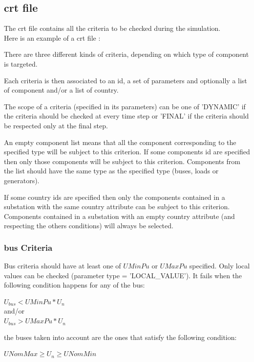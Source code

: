 \documentclass[a4paper, 12pt]{report}
\begin{document}
\subsection{crt file}

The crt file contains all the criteria to be checked during the
simulation.
\\

Here is an example of a crt file :


There are three different kinds of criteria, depending on which type of
component is targeted.

Each criteria is then associated to an id, a set of parameters and optionally a
list of component and/or a list of country.

The scope of a criteria (specified in its parameters) can be one of 'DYNAMIC' if
the criteria should be checked at every time step or 'FINAL' if the criteria
should be respected only at the final step.

An empty component list means that all the component corresponding to the specified type will be subject to this
criterion. If some components id are specified then only those components will
be subject to this criterion. Components from the list should have the same type as the
specified type (buses, loads or generators).

If some country ids are specified then only the components contained in a
substation with the same country attribute can be subject to this
criterion. Components contained in a substation with an empty country attribute
(and respecting the others conditions) will always be selected.

\subsubsection{bus Criteria}

Bus criteria should have at least one of $UMinPu$ or $UMaxPu$ specified. Only
local values can be checked (parameter type = 'LOCAL\_VALUE').
It fails when the following condition happens for any of the bus: \\
\begin{center}
$U_{bus} < UMinPu*U_n$\\
and/or\\
$U_{bus} > UMaxPu*U_n$ \\
\end{center}
the buses taken into account are the ones that satisfy the
following condition:
\begin{center}
$UNomMax \ge U_n \ge UNomMin$\\
\end{center}
\end{document}
